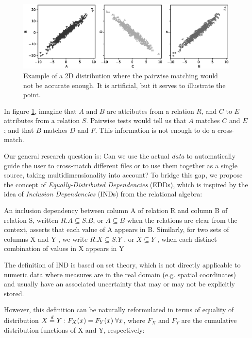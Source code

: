 \begin{figure}[ht]
    \centering
    \includegraphics[width=\linewidth]{images/presq/no2ind}
    \caption{
        Example of a 2D distribution where the pairwise matching would not be accurate enough. It is artificial, but it serves to illustrate the point.
    }
    \label{fig:pairwise_ind}
\end{figure}

\begin{example}
In figure \ref{fig:pairwise_ind}, imagine that $A$ and $B$ are attributes from a relation $R$,
and $C$ to $E$ attributes from a relation $S$.
Pairwise tests would tell us that $A$ matches $C$ and $E$; and that $B$ matches $D$ and $F$.
This information is not enough to do a cross-match.
\end{example}

Our general research question is: Can we use the actual \emph{data} to
automatically guide the user to cross-match different files or to use them together as
a single source, taking multidimensionality into account?
To bridge this gap, we propose the concept of \emph{Equally-Distributed Dependencies}
(EDDs), which is inspired by the idea of \emph{Inclusion Dependencies} (INDs) from the
relational algebra:

\begin{displayquote}
An inclusion dependency between column A of relation
R and column B of relation S, written $R.A \subseteq S.B$, or $A \subseteq B$
when the relations are clear from the context, asserts that each
value of A appears in B. Similarly, for two sets of columns X
and Y , we write $R.X \subseteq S.Y$ , or $X \subseteq Y$ , when each distinct
combination of values in X appears in Y \cite{abedjan2015}
\end{displayquote}

The definition of IND is based on set theory, which is not directly applicable to
numeric data where measures are in the real domain (e.g. spatial coordinates) and usually
have an associated uncertainty that may or may not be explicitly stored.

However, this definition can be naturally reformulated in terms of
equality of distribution $X \stackrel{d}{=} Y: F_X(x) = F_Y(x) \; \forall x$, where $F_X$ and
$F_Y$ are the cumulative distribution functions of X and Y, respectively:


